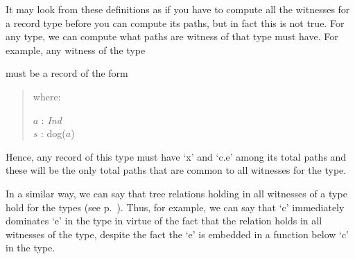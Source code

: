 It may look from these definitions as if you have to compute all the
witnesses for a record type before you can compute its paths, but in
fact this is not true.  For any type, we can compute what paths are
witness of that type must have. For example, any witness of the type
\begin{quote}
\end{quote}
must be a record of the form
\begin{quote}

where:

$a$ : \textit{Ind}\\
$s$ : dog($a$)
\end{quote}
Hence, any record of this type must have `x' and `c.e' among its total
paths and these will be the only total paths that are common to all
witnesses for the type.  

In a similar way, we can say that tree relations holding in all
witnesses of a type hold for the types (see
p.~\pageref{pg:imm-dom}). Thus, for example, we can say that `c'
immediately dominates `e' in the type in virtue of the fact that the
relation holds in all witnesses of the type, despite the fact the `e'
is embedded in a function below `c' in the type.

